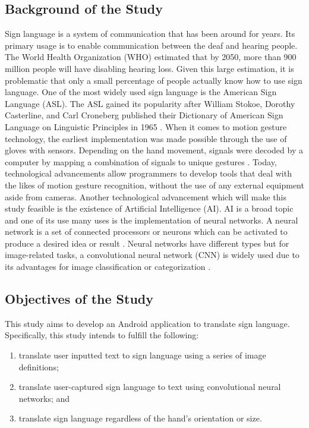 \documentclass[journal]{./IEEE/IEEEtran}
\begin{document}
\subsection{Background of the Study}
Sign language is a system of communication that has been around for years. Its primary usage is to enable communication between the deaf and hearing people. The World Health Organization (WHO) \cite{WHO2018} estimated that by 2050, more than 900 million people will have disabling hearing loss. Given this large estimation, it is problematic that only a small percentage of people actually know how to use sign language. One of the most widely used sign language is the American Sign Language (ASL). The ASL gained its popularity after William Stokoe, Dorothy Casterline, and Carl Croneberg published their Dictionary of American Sign Language on Linguistic Principles in 1965 \cite{Wilcox1991}.
\newline
\indent When it comes to motion gesture technology, the earliest implementation was made possible through the use of gloves with sensors. Depending on the hand movement, signals were decoded by a computer by mapping a combination of signals to unique gestures \cite{Sharma2015}.  Today, technological advancements allow programmers to develop tools that deal with the likes of motion gesture recognition, without the use of any external equipment aside from cameras.
\newline
\indent Another technological advancement which will make this study feasible is the existence of Artificial Intelligence (AI). AI is a broad topic and one of its use many uses is the implementation of neural networks. A neural network is a set of connected processors or neurons which can be activated to produce a desired idea or result \cite{Schmidhuber2015}. Neural networks have different types but for image-related tasks, a convolutional neural network (CNN) is widely used due to its advantages for image classification or categorization \cite{Wu2016}.

\subsection{Objectives of the Study}
This study aims to develop an Android application to translate sign language. Specifically, this study intends to fulfill the following:

\begin{enumerate}
\item translate user inputted text to sign language using a series of image definitions;
\item translate user-captured sign language to text using convolutional neural networks; and
\item translate sign language regardless of the hand's orientation or size.
\end{enumerate}
\end{document}
